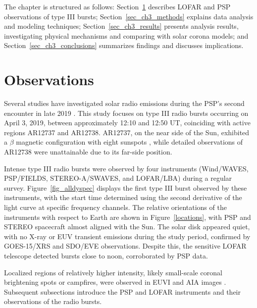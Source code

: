 The chapter is structured as follows: Section~\ref{sec_ch3_obs} describes LOFAR and PSP observations of type III bursts; Section~\ref{sec_ch3_methods} explains data analysis and modeling techniques; Section~\ref{sec_ch3_results} presents analysis results, investigating physical mechanisms and comparing with solar corona models; and Section~\ref{sec_ch3_conclusions} summarizes findings and discusses implications.

\section{Observations}
\label{sec_ch3_obs}
Several studies have investigated solar radio emissions during the PSP's second encounter in late 2019 \cite{krupar_2020, pulupa_2020, cattell_2021, harra_2021, badman_2022}. This study focuses on type III radio bursts occurring on April 3, 2019, between approximately 12:10 and 12:50 UT, coinciding with active regions AR12737 and AR12738. AR12737, on the near side of the Sun, exhibited a $\beta$ magnetic configuration with eight sunspots \cite{hale_2019}, while detailed observations of AR12738 were unattainable due to its far-side position.

Intense type III radio bursts were observed by four instruments (Wind/WAVES, PSP/FIELDS, STEREO-A/SWAVES, and LOFAR/LBA) during a regular survey. Figure~\ref{fig_alldyspec} displays the first type III burst observed by these instruments, with the start time determined using the second derivative of the light curve at specific frequency channels. The relative orientations of the instruments with respect to Earth are shown in Figure~\ref{locations}, with PSP and STEREO spacecraft almost aligned with the Sun. The solar disk appeared quiet, with no X-ray or EUV transient emissions during the study period, confirmed by GOES-15/XRS and SDO/EVE observations. Despite this, the sensitive LOFAR telescope detected bursts close to noon, corroborated by PSP data.

Localized regions of relatively higher intensity, likely small-scale coronal brightening spots or campfires, were observed in EUVI and AIA images \cite{young_2018, madjarska_2019, berghmans_2021}. Subsequent subsections introduce the PSP and LOFAR instruments and their observations of the radio bursts.

